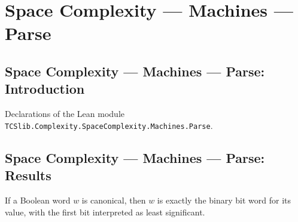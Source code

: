 \section{Space Complexity --- Machines --- Parse}
\subsection*{Space Complexity --- Machines --- Parse: Introduction}

Declarations of the Lean module \texttt{TCSlib.Complexity.SpaceComplexity.Machines.Parse}.

\subsection*{Space Complexity --- Machines --- Parse: Results}

\begin{lemma}
\label{Complexity.LogProg.canon_eq_bits}
\leanok
{}
If a Boolean word $w$ is canonical, then $w$ is exactly the binary bit word for its
value, with the first bit interpreted as least significant.
\end{lemma}

